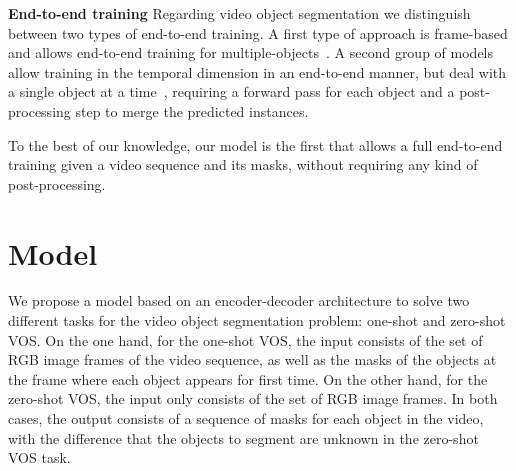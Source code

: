 \documentclass[10pt,twocolumn,letterpaper]{article}
\begin{document}
\textbf{End-to-end training} Regarding video object segmentation we distinguish between two types of end-to-end training. A first type of approach is frame-based and allows end-to-end training for multiple-objects~\cite{voigtlaender2017online, maninis2018video}. A second group of models allow training in the temporal dimension in an end-to-end manner, but deal with a single object at a time~\cite{xu2018youtube}, requiring a forward pass for each object and a post-processing step to merge the predicted instances. 

To the best of our knowledge, our model is the first that allows a full end-to-end training given a video sequence and its masks, without requiring any kind of post-processing. 

\iffalse
\begin{itemize}
    \item First fully end-to-end, single-stage, architecture for video object segmentation.
    \item Prepared to handle both zero-shot and one-shot.
    \item No need of online learning. 
    \item Multiple objects for video object segmentation task with one instantiation of the network.
    \item ?
 
\end{itemize}
\fi


\label{sec:relatedwork} \section{Model}
\label{sec:model}

We propose a model based on an encoder-decoder architecture to solve two different tasks for the video object segmentation problem: one-shot and zero-shot VOS. On the one hand, for the one-shot VOS, the input consists of the set of RGB image frames of the video sequence, as well as the masks of the objects at the frame where each object appears for first time. On the other hand, for the zero-shot VOS, the input only consists of the set of RGB image frames. In both cases, the output consists of a sequence of masks for each object in the video, with the difference that the objects to segment are unknown in the zero-shot VOS task.
\end{document}
